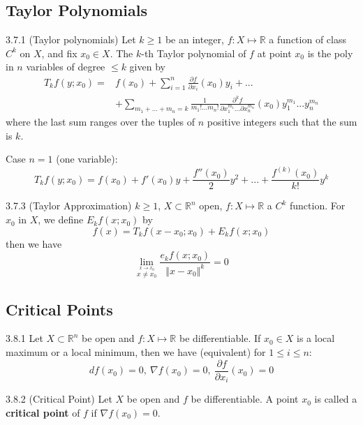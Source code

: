 \documentclass[8pt,a4paper,twocolumn,table]{extarticle}
\newcommand{\R}{\mathbb{R}}
\begin{document}
\subsection{Taylor Polynomials}
\begin{definition}{3.7.1 (Taylor polynomials)}
    Let $k \ge 1$ be an integer, $f: X \mapsto \R$ a function of class $C^k$ on $X$, and fix $x_0 \in X$. The
    $k$-th Taylor polynomial of $f$ at point $x_0$ is the poly in $n$ variables of degree $\le k$ given by
    \begin{align*}
        T_k f(y;x_0) = & f(x_0) + \sum_{i=1}^n \frac{\partial f}{\partial x_i}(x_0)y_i + ...                                                                          \\
                       & + \sum_{m_1 + ... + m_n = k} \frac{1}{m_1!...m_n!} \frac{\partial^k f}{\partial x_1^{m_1} ... \partial x_n^{m_n}} (x_0)y_1^{m_1}...y_n^{m_n}
    \end{align*}
    where the last sum ranges over the tuples of $n$ positive integers such that the sum is $k$.

    Case $n=1$ (one variable):
    \[ T_k f(y; x_0) = f(x_0) + f'(x_0)y + \frac{f''(x_0)}{2}y^2 + ... + \frac{f^{(k)}(x_0)}{k!}y^k \]
\end{definition}

\begin{proposition}{3.7.3 (Taylor Approximation)}
    $k \ge 1$, $X \subset \R^n$ open, $f: X \mapsto \R$ a $C^k$ function. For $x_0$ in $X$, we define $E_k f(x;x_0)$ by
    \[ f(x) = T_k f(x - x_0;x_0) + E_k f(x;x_0) \]
    then we have
    \[ \lim_{\stackrel{x \to x_0}{x \ne x_0}} \frac{e_k f(x;x_0)}{\Vert x - x_0 \Vert^k} = 0 \]
\end{proposition}


\subsection{Critical Points}
\begin{proposition}{3.8.1}
    Let $X \subset \R^n$ be open and $f: X \mapsto \R$ be differentiable.
    If $x_0 \in X$ is a local maximum or a local minimum, then we have (equivalent) for $1 \le i \le n$:
    \[ df(x_0) = 0,\ \nabla f(x_0) = 0,\ \frac{\partial f}{\partial x_i}(x_0) = 0 \]
\end{proposition}

\begin{definition}{3.8.2 (Critical Point)}
    Let $X$ be open and $f$ be differentiable.
    A point $x_0$ is called a \textbf{critical point} of $f$ if $\nabla f(x_0) = 0$.
\end{definition}
\end{document}
